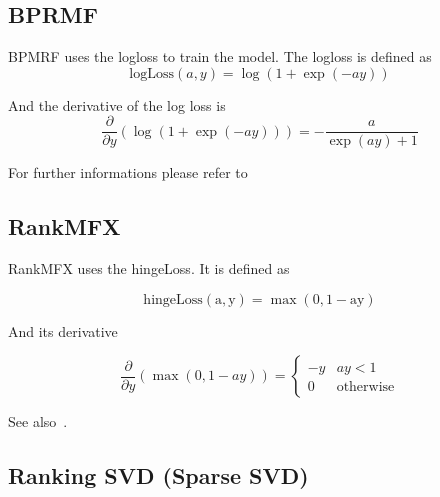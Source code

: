 \subsection{BPRMF}

BPMRF uses the logloss to train the model. The logloss is defined
as
\begin{equation}
\textrm{logLoss}(a,y)=\log(1+\exp(-ay))
\end{equation}


And the derivative of the log loss is
\begin{equation}
\frac{\partial}{\partial y}(\log(1+\exp(-ay)))=-\frac{a}{\exp(ay)+1}
\end{equation}

For further informations please refer to~\cite{Rendle:2009:BBP:1795114.1795167}


\subsection{RankMFX}

RankMFX uses the hingeLoss. It is defined as

\begin{equation}
\mathrm{\textrm{hingeLoss}(a,y)=\max(0,1-ay)}
\end{equation}

And its derivative

\begin{equation}
\frac{\partial}{\partial y}(\max(0,1-ay))=\begin{cases}
-y & ay<1\\
0 & \textrm{otherwise}
\end{cases}
\end{equation}


See also~\cite{diaz2012happening}.


\subsection{Ranking SVD (Sparse SVD)}

